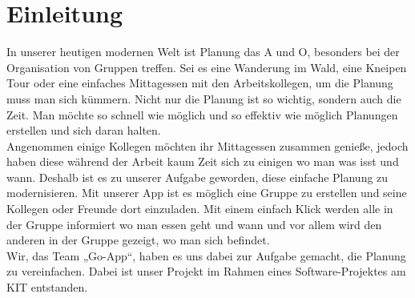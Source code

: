 \section{Einleitung}
In unserer heutigen modernen Welt ist Planung das A und O, besonders bei der Organisation von Gruppen treffen. Sei es eine Wanderung im Wald, eine Kneipen Tour oder eine einfaches Mittagessen mit den Arbeitskollegen, um die Planung muss man sich kümmern. Nicht nur die Planung ist so wichtig, sondern auch die Zeit. Man möchte so schnell wie möglich und so effektiv wie möglich Planungen erstellen und sich daran halten. \\
Angenommen einige Kollegen möchten ihr Mittagessen zusammen genieße, jedoch haben diese während der Arbeit kaum Zeit sich zu einigen wo man was isst und wann. Deshalb ist es zu unserer Aufgabe geworden, diese einfache Planung zu modernisieren. Mit unserer App ist es möglich eine Gruppe zu erstellen und seine Kollegen oder Freunde dort einzuladen. Mit einem einfach Klick werden alle in der Gruppe informiert wo man essen geht und wann und vor allem wird den anderen in der Gruppe gezeigt, wo man sich befindet. \\
Wir, das Team „Go-App“, haben es uns dabei zur Aufgabe gemacht, die Planung zu vereinfachen. Dabei ist unser Projekt im Rahmen eines Software-Projektes am KIT entstanden. \\